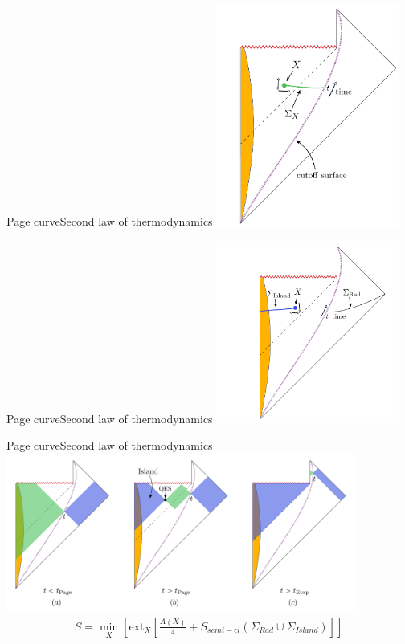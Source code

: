 \documentclass{beamer}[10]
\begin{document}
\begin{frame}{Page curve}{Second law of thermodynamics}
	\centering \includegraphics[width=6cm]{Island1.png}		\vspace*{1cm}\newline
\end{frame}
\begin{frame}{Page curve}{Second law of thermodynamics}
	\centering \includegraphics[width=6cm]{Island2.png}		\vspace*{1cm}\newline
\end{frame}
\begin{frame}{Page curve}{Second law of thermodynamics}
	\centering \includegraphics[width=11.5cm]{Island3.png}		\newline
	\begin{equation}
		\begin{aligned}
				S= \min_X[\text{ext}_X[\frac{A(X)}{4}+S_{semi-cl}(\Sigma_{Rad}\cup \Sigma_{Island})]]
		\end{aligned}
	\end{equation}
\end{frame}
\end{document}
